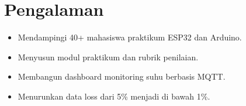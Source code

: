 \section{Pengalaman}
\begin{itemize}
  \item Mendampingi 40+ mahasiswa praktikum ESP32 dan Arduino.
  \item Menyusun modul praktikum dan rubrik penilaian.
\end{itemize}
\begin{itemize}
  \item Membangun dashboard monitoring suhu berbasis MQTT.
  \item Menurunkan data loss dari 5\% menjadi di bawah 1\%.
\end{itemize}
